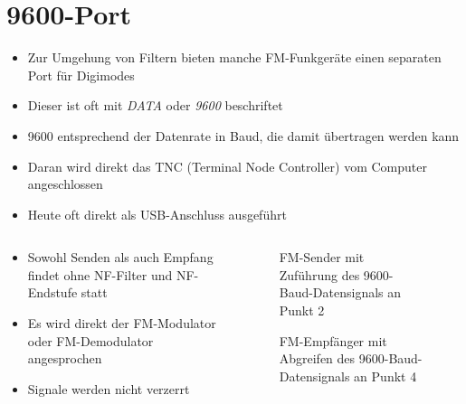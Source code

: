 
\section{9600-Port}
\label{section:9600_port}
\begin{frame}%
\begin{itemize}
  \item Zur Umgehung von Filtern bieten manche FM-Funkgeräte einen separaten Port für Digimodes
  \item Dieser ist oft mit \emph{DATA} oder \emph{9600} beschriftet
  \item 9600 entsprechend der Datenrate in Baud, die damit übertragen werden kann
  \item Daran wird direkt das TNC (Terminal Node Controller) vom Computer angeschlossen
  \item Heute oft direkt als USB-Anschluss ausgeführt
  \end{itemize}
\end{frame}

\begin{frame}
\begin{columns}
    \begin{column}{0.48\textwidth}
    \begin{itemize}
  \item Sowohl Senden als auch Empfang findet ohne NF-Filter und NF-Endstufe statt
  \item Es wird direkt der FM-Modulator oder FM-Demodulator angesprochen
  \item Signale werden nicht verzerrt
  \end{itemize}

    \end{column}
   \begin{column}{0.48\textwidth}
       
\begin{figure}
    \caption{\scriptsize FM-Sender mit Zuführung des 9600-Baud-Datensignals an Punkt 2}
    \label{e_9600_port_fm_sender}
\end{figure}


\begin{figure}
    \caption{\scriptsize FM-Empfänger mit Abgreifen des 9600-Baud-Datensignals an Punkt 4}
    \label{e_9600_port_fm_empfaenger}
\end{figure}


   \end{column}
\end{columns}

\end{frame}

